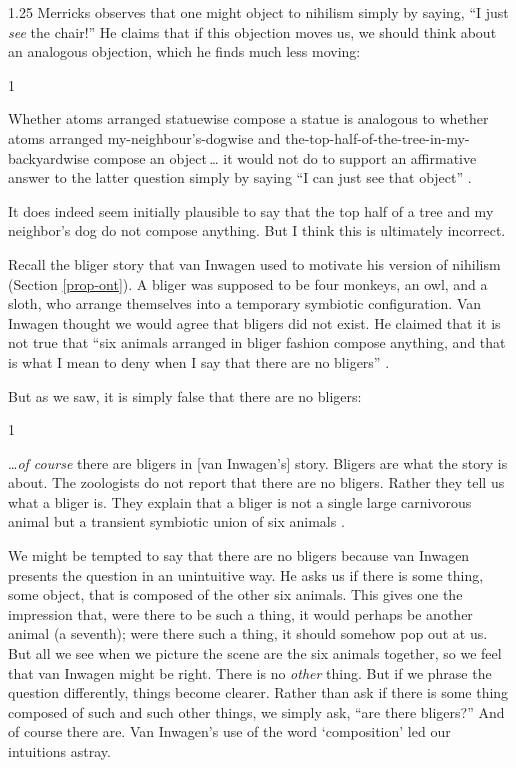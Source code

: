 \documentclass[11pt]{article}
\newenvironment{squote}{%
\begin{spacing}{1}
       	\begin{list}{}{%
\setlength{\labelwidth}{0pt}%
\rightmargin\leftmargin%
}
\item\relax
}{%
\end{list}%
\end{spacing}
}
\begin{document}
\begin{spacing}{1.25}
Merricks observes that one might object to nihilism simply by saying,
``I just {\em see} the chair!''  He claims that if this objection
moves us, we should think about an analogous objection, which he finds
much less moving:

\begin{squote}
Whether atoms arranged statuewise compose a statue is analogous to
whether atoms arranged my-neighbour's-dogwise and
the-top-half-of-the-tree-in-my-backyardwise compose an object\,\ldots
it would not do to support an affirmative answer to the latter
question simply by saying ``I can just see that object''
\citeyearpar[73]{merricks2001a}.
\end{squote}

It does indeed seem initially plausible to say that the top half of a
tree and my neighbor's dog do not compose anything.  But I think this
is ultimately incorrect.

Recall the bliger story that van Inwagen used to motivate his version
of nihilism (Section \ref{prop-ont}).  A bliger was supposed to be
four monkeys, an owl, and a sloth, who arrange themselves into a
temporary symbiotic configuration.  Van Inwagen thought we would agree
that bligers did not exist.  He claimed that it is not true that ``six
animals arranged in bliger fashion compose anything, and that is what
I mean to deny when I say that there are no bligers''
\citeyearpar[104]{inwagen1995}.

But as we saw, it is simply false that there are no bligers:

\begin{squote}
\ldots {\em of course} there are bligers in [van Inwagen's] story.
Bligers are what the story is about.  The zoologists do not report
that there are no bligers.  Rather they tell us what a bliger is.
They explain that a bliger is not a single large carnivorous animal
but a transient symbiotic union of six animals
\citep[704]{rosenberg1993}.
\end{squote}

We might be tempted to say that there are no bligers because van
Inwagen presents the question in an unintuitive way.  He asks us if
there is some thing, some object, that is composed of the other six
animals.  This gives one the impression that, were there to be such a
thing, it would perhaps be another animal (a seventh); were there such
a thing, it should somehow pop out at us.  But all we see when we
picture the scene are the six animals together, so we feel that van
Inwagen might be right.  There is no {\em other} thing.  But if we
phrase the question differently, things become clearer.  Rather than
ask if there is some thing composed of such and such other things, we
simply ask, ``are there bligers?''  And of course there are.  Van
Inwagen's use of the word `composition' led our intuitions astray.


\end{spacing}
\end{document}
